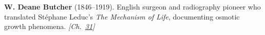 \textbf{W. Deane Butcher} (1846–1919). English surgeon and radiography pioneer who translated Stéphane Leduc's \emph{The Mechanism of Life}, documenting osmotic growth phenomena. \emph{[Ch.~\hyperref[ch:osmosisdebye]{31}]}

